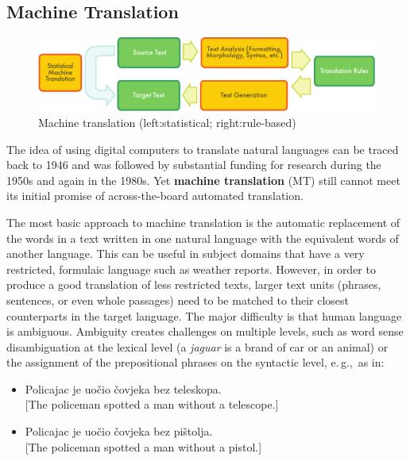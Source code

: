 \begin{multicols}{2}
\subsection{Machine Translation}

\begin{figure}[htb]
  \center
  \includegraphics[width=\textwidth]{../_media/english/machine_translation}
  \caption{Machine translation (left:statistical; right:rule-based)}
  \label{fig:mtarch_en}
\end{figure}

The idea of using digital computers to translate natural languages can be traced back to 1946 and was followed by substantial funding for research during the 1950s and again in the 1980s. Yet \textbf{machine translation} (MT) still cannot meet its initial promise of across-the-board automated translation.
 

The most basic approach to machine translation is the automatic replacement of the words in a text written in one natural language with the equivalent words of another language. This can be useful in subject domains that have a very restricted, formulaic language such as weather reports. However, in order to produce a good translation of less restricted texts, larger text units (phrases, sentences, or even whole passages) need to be matched to their closest counterparts in the target language. The major difficulty is that human language is ambiguous. Ambiguity creates challenges on multiple levels, such as word sense disambiguation at the lexical level (a \emph{jaguar} is a brand of car or an animal) or the assignment of the prepositional phrases on the syntactic level, e.\,g.,~as in:

\begin{itemize}
\item Policajac je uočio čovjeka bez teleskopa.\\
  {[}The policeman spotted a man without a telescope.{]} 
\item Policajac je uočio čovjeka bez pištolja.\\
  {[}The policeman spotted a man without a pistol.{]}
\end{itemize}


\end{multicols}
